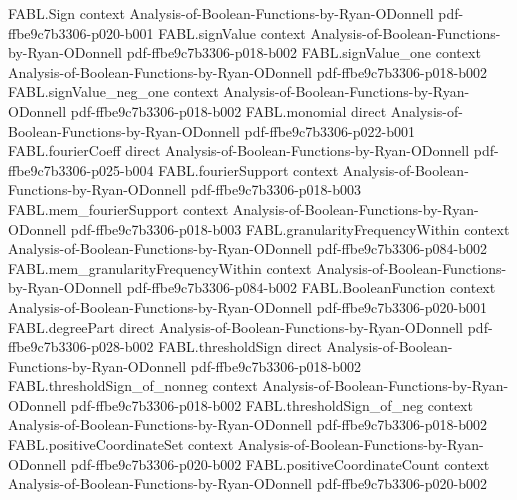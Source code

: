\begin{theorem}
\label{FABL.degreePart_one_eq_linearForm}
\leanok
{}
\proofstep
  {FABL.Sign}
  {context}
  {Analysis-of-Boolean-Functions-by-Ryan-ODonnell}
  {pdf-ffbe9c7b3306-p020-b001}
\proofstep
  {FABL.signValue}
  {context}
  {Analysis-of-Boolean-Functions-by-Ryan-ODonnell}
  {pdf-ffbe9c7b3306-p018-b002}
\proofstep
  {FABL.signValue_one}
  {context}
  {Analysis-of-Boolean-Functions-by-Ryan-ODonnell}
  {pdf-ffbe9c7b3306-p018-b002}
\proofstep
  {FABL.signValue_neg_one}
  {context}
  {Analysis-of-Boolean-Functions-by-Ryan-ODonnell}
  {pdf-ffbe9c7b3306-p018-b002}
\proofstep
  {FABL.monomial}
  {direct}
  {Analysis-of-Boolean-Functions-by-Ryan-ODonnell}
  {pdf-ffbe9c7b3306-p022-b001}
\proofstep
  {FABL.fourierCoeff}
  {direct}
  {Analysis-of-Boolean-Functions-by-Ryan-ODonnell}
  {pdf-ffbe9c7b3306-p025-b004}
\proofstep
  {FABL.fourierSupport}
  {context}
  {Analysis-of-Boolean-Functions-by-Ryan-ODonnell}
  {pdf-ffbe9c7b3306-p018-b003}
\proofstep
  {FABL.mem_fourierSupport}
  {context}
  {Analysis-of-Boolean-Functions-by-Ryan-ODonnell}
  {pdf-ffbe9c7b3306-p018-b003}
\proofstep
  {FABL.granularityFrequencyWithin}
  {context}
  {Analysis-of-Boolean-Functions-by-Ryan-ODonnell}
  {pdf-ffbe9c7b3306-p084-b002}
\proofstep
  {FABL.mem_granularityFrequencyWithin}
  {context}
  {Analysis-of-Boolean-Functions-by-Ryan-ODonnell}
  {pdf-ffbe9c7b3306-p084-b002}
\proofstep
  {FABL.BooleanFunction}
  {context}
  {Analysis-of-Boolean-Functions-by-Ryan-ODonnell}
  {pdf-ffbe9c7b3306-p020-b001}
\proofstep
  {FABL.degreePart}
  {direct}
  {Analysis-of-Boolean-Functions-by-Ryan-ODonnell}
  {pdf-ffbe9c7b3306-p028-b002}
\proofstep
  {FABL.thresholdSign}
  {direct}
  {Analysis-of-Boolean-Functions-by-Ryan-ODonnell}
  {pdf-ffbe9c7b3306-p018-b002}
\proofstep
  {FABL.thresholdSign_of_nonneg}
  {context}
  {Analysis-of-Boolean-Functions-by-Ryan-ODonnell}
  {pdf-ffbe9c7b3306-p018-b002}
\proofstep
  {FABL.thresholdSign_of_neg}
  {context}
  {Analysis-of-Boolean-Functions-by-Ryan-ODonnell}
  {pdf-ffbe9c7b3306-p018-b002}
\proofstep
  {FABL.positiveCoordinateSet}
  {context}
  {Analysis-of-Boolean-Functions-by-Ryan-ODonnell}
  {pdf-ffbe9c7b3306-p020-b002}
\proofstep
  {FABL.positiveCoordinateCount}
  {context}
  {Analysis-of-Boolean-Functions-by-Ryan-ODonnell}
  {pdf-ffbe9c7b3306-p020-b002}

\end{theorem}
